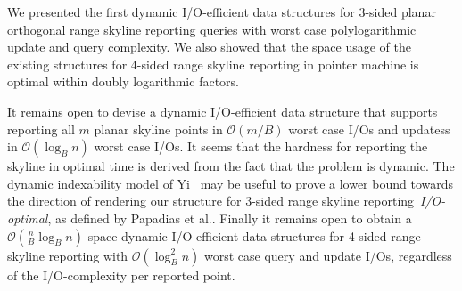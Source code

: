\documentclass[]{article}
\newcommand{\bigO}{\mathcal{O}}
\begin{document}
We presented the first dynamic I/O-efficient data structures for 3-sided planar
orthogonal range skyline reporting queries with worst case polylogarithmic
update and query complexity. We also showed that the space usage of the existing
structures for 4-sided range skyline reporting in pointer machine is optimal
within doubly logarithmic factors.

It remains open to devise a dynamic I/O-efficient data structure that supports
reporting all $m$ planar skyline points in $\bigO(m/B)$ worst case I/Os and
updatess in $\bigO(\log_B n)$ worst case I/Os. It seems that the hardness for
reporting the skyline in optimal time is derived from the fact that the problem
is dynamic. The dynamic indexability model of Yi~\cite{Y09} may be useful to
prove a lower bound towards the direction of rendering our structure for 3-sided
range skyline reporting~\textit{I/O-optimal}, as defined by Papadias et
al.\cite{PTFS05}. Finally it remains open to obtain a $\bigO(\frac{n}{B}\log_B
n)$ space dynamic I/O-efficient data structures for 4-sided range skyline
reporting with $\bigO(\log^2_B n)$ worst case query and update I/Os, regardless
of the I/O-complexity per reported point.

\clearpage
	
	
\end{document}
